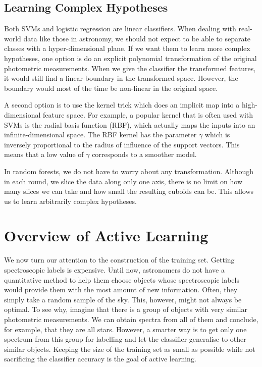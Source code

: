 \subsection{Learning Complex Hypotheses}
\label{sub:complex}

Both SVMs and logistic regression are linear classifiers. When dealing with real-world data like
those in astronomy, we should not expect to be able to separate classes with a hyper-dimensional
plane. If we want them to learn more complex hypotheses, one option is do an explicit polynomial
transformation  of the original photometric measurements. When we
give the classifier the transformed features, it would still find a linear boundary in the
transformed space. However, the boundary would most of the time be non-linear in the original space.

A second option is to use the kernel trick which does an implicit map into a high-dimensional
feature space. For example, a popular kernel that is often used with SVMs is the radial basis
function  (RBF), which actually maps the inputs into an infinite-dimensional
space. The RBF kernel has the parameter $\gamma$ which is inversely proportional to the radius of
influence of the support vectors. This means that a low value of $\gamma$ corresponds to a smoother
model.

In random forests, we do not have to worry about any transformation. Although in each round, we
slice the data along only one axis, there is no limit on how many slices we can take and how small
the resulting cuboids can be. This allows us to learn arbitrarily complex hypotheses.


\section{Overview of Active Learning} 
\label{sec:active}

We now turn our attention to the construction of the training set. Getting spectroscopic labels is
expensive. Until now, astronomers do not have a quantitative method to help them choose objects
whose spectroscopic labels would provide them with the most amount of new information. Often, they
simply take a random sample of the sky. This, however, might not always be optimal. To see why,
imagine that there is a group of objects with very similar photometric measurements. We can obtain
spectra from all of them and conclude, for example, that they are all stars. However, a smarter way
is to get only one spectrum from this group for labelling and let the classifier generalise to
other similar objects. Keeping the size of the training set as small as possible while not
sacrificing the classifier accuracy is the goal of active learning.

